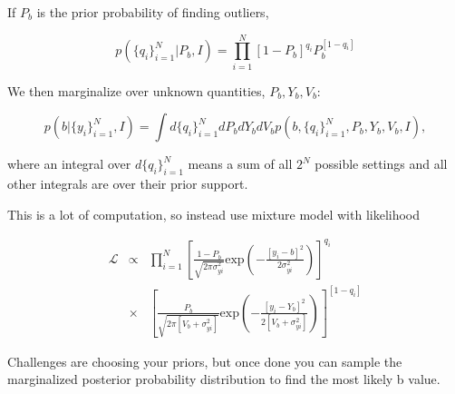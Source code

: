 \documentclass[a4paper,11pt]{scrartcl}
\begin{document}
If $P_b$ is the prior probability of finding outliers,

\begin{equation}
p(\{q_i\}^N_{i=1}|P_b,I) = \prod_{i=1}^N[1-P_b]^{q_i}P_b^{[1-q_i]}
\end{equation}

We then marginalize over unknown quantities, $P_b,Y_b,V_b$:

\begin{equation}
p(b|\{y_i\}_{i=1}^N,I) = \int d\{q_i\}_{i=1}^N dP_b dY_b dV_b p(b,\{q_i\}_{i=1}^N,P_b,Y_b,V_b,I),
\end{equation}

where an integral over $d\{q_i\}_{i=1}^N$ means a sum of all $2^N$ possible settings and all other integrals are over their prior support.

This is a lot of computation, so instead use mixture model with likelihood

\begin{eqnarray}
\mathcal{L} &\propto& \prod_{i=1}^N \left[\frac{1-P_b}{\sqrt{2\pi\sigma_{yi}^2}}\mathrm{exp}\left(-\frac{[y_i-b]^2}{2\sigma_{yi}^2}\right)\right]^{q_i}\\
&\times& \left[\frac{P_b}{\sqrt{2\pi[V_b+\sigma^2_{yi}]}}\mathrm{exp}\left(-\frac{[y_i-Y_b]^2}{2[V_b+\sigma_{yi}^2]}\right)\right]^{[1-q_i]}
\end{eqnarray}

Challenges are choosing your priors, but once done you can sample the marginalized posterior probability distribution to find the most likely b value.
\end{document}
